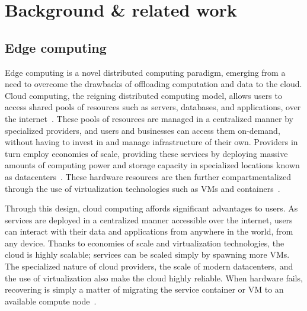 \section{Background \& related work}
\glsresetall%

\subsection{Edge computing}

Edge computing is a novel distributed computing paradigm, emerging from a need to overcome the drawbacks of offloading computation and data to the cloud.
Cloud computing, the reigning distributed computing model, allows users to access shared pools of resources such as servers, databases, and applications, over the internet~\cite{gai2012towards}.
These pools of resources are managed in a centralized manner by specialized providers, and users and businesses can access them on-demand, without having to invest in and manage infrastructure of their own.
Providers in turn employ economies of scale, providing these services by deploying massive amounts of computing power and storage capacity in specialized locations known as datacenters~\citationeeded.
These hardware resources are then further compartmentalized through the use of virtualization technologies such as \glspl{VM} and containers~\cite{gai2012towards}.

Through this design, cloud computing affords significant advantages to users.
As services are deployed in a centralized manner accessible over the internet, users can interact with their data and applications from anywhere in the world, from any device.
Thanks to economies of scale and virtualization technologies, the cloud is highly scalable;
services can be scaled simply by spawning more \glspl{VM}.
The specialized nature of cloud providers, the scale of modern datacenters, and the use of virtualization also make the cloud highly reliable.
When hardware fails, recovering is simply a matter of migrating the service container or \gls{VM} to an available compute node~\cite{endo2016high}.

